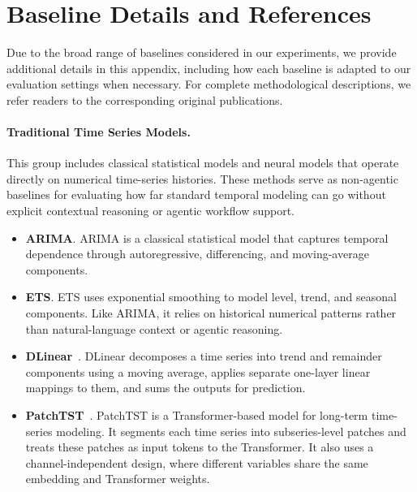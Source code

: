 \section{Baseline Details and References}
\label{ap:baselines}

Due to the broad range of baselines considered in our experiments, we provide additional details in this appendix, including how each baseline is adapted to our evaluation settings when necessary. For complete methodological descriptions, we refer readers to the corresponding original publications.


\paragraph{Traditional Time Series Models.}
This group includes classical statistical models and neural models that operate directly on numerical time-series histories. These methods serve as non-agentic baselines for evaluating how far standard temporal modeling can go without explicit contextual reasoning or agentic workflow support.

\begin{itemize}
   \item \textbf{ARIMA}.
    ARIMA is a classical statistical model that captures temporal dependence through autoregressive, differencing, and moving-average components.


    \item \textbf{ETS}.
    ETS uses exponential smoothing to model level, trend, and seasonal
    components. Like ARIMA, it relies on historical numerical patterns rather than natural-language context or agentic reasoning.

    \item \textbf{DLinear}~\citep{DBLP:conf/aaai/ZengCZ023}.
    DLinear decomposes a time series into trend and remainder components using a moving average, applies separate one-layer linear mappings to them, and sums the outputs for prediction.

    \item \textbf{PatchTST}~\citep{DBLP:conf/iclr/NieNSK23}.
    PatchTST is a Transformer-based model for long-term time-series modeling. It segments each time series into subseries-level patches and treats these patches as input tokens to the Transformer. It also uses a channel-independent design, where different variables share the same embedding and Transformer weights.
\end{itemize}

